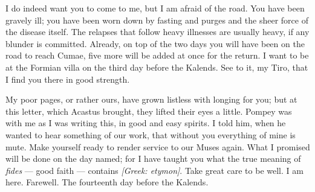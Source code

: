 

 I do indeed want you to come to me, but I am afraid of the road. You have been gravely ill; you have been worn down by fasting and purges and the sheer force of the disease itself. The relapses that follow heavy illnesses are usually heavy, if any blunder is committed. Already, on top of the two days you will have been on the road to reach Cumae, five more will be added at once for the return. I want to be at the Formian villa on the third day before the Kalends. See to it, my Tiro, that I find you there in good strength.

 My poor pages, or rather ours, have grown listless with longing for you; but at this letter, which Acastus brought, they lifted their eyes a little. Pompey was with me as I was writing this, in good and easy spirits. I told him, when he wanted to hear something of our work, that without you everything of mine is mute. Make yourself ready to render service to our Muses again. What I promised will be done on the day named; for I have taught you what the true meaning of \textit{fides} --- good faith --- contains \textit{[Greek: etymon]}. Take great care to be well. I am here. Farewell. The fourteenth day before the Kalends.

